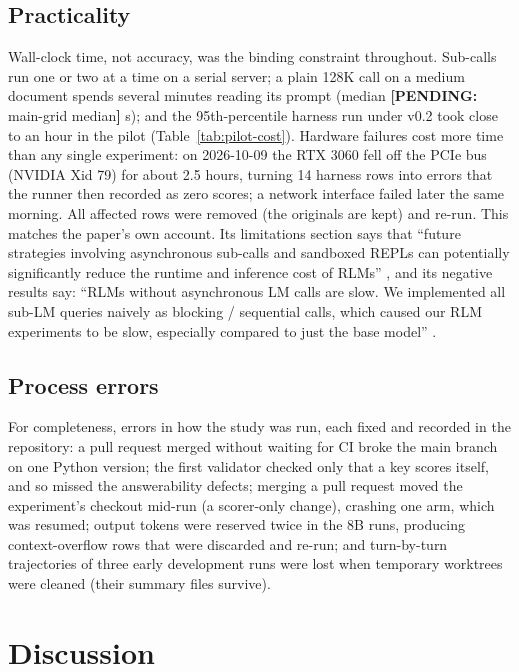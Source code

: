 \documentclass[11pt]{article}
\newcommand{\PENDING}[1]{\textcolor{orange!80!black}{\textbf{[PENDING:} #1\textbf{]}}}
\begin{document}
\subsection{Practicality}
Wall-clock time, not accuracy, was the binding constraint throughout. Sub-calls run
one or two at a time on a serial server; a plain 128K call on a medium document spends
several minutes reading its prompt (median \PENDING{main-grid median} s); and the
95th-percentile harness run under v0.2 took close to an hour in the pilot
(Table~\ref{tab:pilot-cost}). Hardware failures cost more time than any single
experiment: on 2026-10-09 the RTX 3060 fell off the PCIe bus (NVIDIA Xid 79) for
about 2.5 hours, turning 14 harness rows into errors that the runner then recorded
as zero scores; a network interface failed later the same morning. All affected
rows were removed (the originals are kept) and re-run. This matches the paper's own
account. Its limitations section says that ``future strategies involving
asynchronous sub-calls and sandboxed REPLs can potentially significantly reduce the
runtime and inference cost of RLMs'' \citep[\S7]{zhang2025rlm}, and its negative
results say: ``RLMs without asynchronous LM calls are slow. We implemented all
sub-LM queries naively as blocking / sequential calls, which caused our RLM
experiments to be slow, especially compared to just the base model''
\citep[App.~B]{zhang2025rlm}.

\subsection{Process errors}
For completeness, errors in how the study was run, each fixed and recorded in the
repository: a pull request merged without waiting for CI broke the main branch on
one Python version; the first validator checked only that a key scores itself, and
so missed the answerability defects; merging a pull request moved the experiment's
checkout mid-run (a scorer-only change), crashing one arm, which was resumed;
output tokens were reserved twice in the 8B runs, producing context-overflow rows that
were discarded and re-run; and turn-by-turn trajectories of three early development
runs were lost when temporary worktrees were cleaned (their summary files survive).

\section{Discussion}
\label{sec:discussion}
\end{document}
